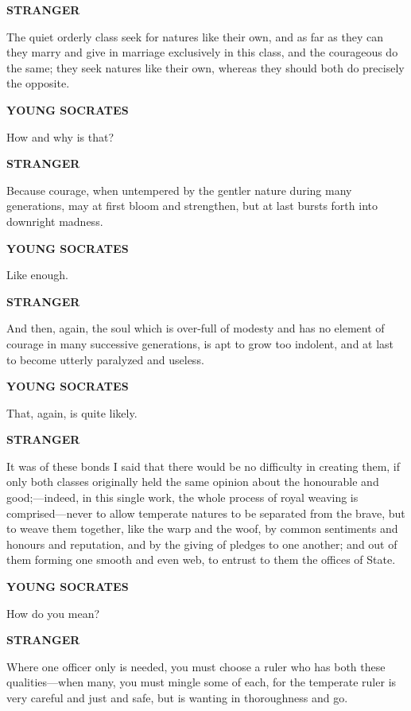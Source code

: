 \documentclass[11pt,letter]{article}
\begin{document}
\par \textbf{STRANGER}
\par   The quiet orderly class seek for natures like their own, and as far as they can they marry and give in marriage exclusively in this class, and the courageous do the same; they seek natures like their own, whereas they should both do precisely the opposite.

\par \textbf{YOUNG SOCRATES}
\par   How and why is that?

\par \textbf{STRANGER}
\par   Because courage, when untempered by the gentler nature during many generations, may at first bloom and strengthen, but at last bursts forth into downright madness.

\par \textbf{YOUNG SOCRATES}
\par   Like enough.

\par \textbf{STRANGER}
\par   And then, again, the soul which is over-full of modesty and has no element of courage in many successive generations, is apt to grow too indolent, and at last to become utterly paralyzed and useless.

\par \textbf{YOUNG SOCRATES}
\par   That, again, is quite likely.

\par \textbf{STRANGER}
\par   It was of these bonds I said that there would be no difficulty in creating them, if only both classes originally held the same opinion about the honourable and good;—indeed, in this single work, the whole process of royal weaving is comprised—never to allow temperate natures to be separated from the brave, but to weave them together, like the warp and the woof, by common sentiments and honours and reputation, and by the giving of pledges to one another; and out of them forming one smooth and even web, to entrust to them the offices of State.

\par \textbf{YOUNG SOCRATES}
\par   How do you mean?

\par \textbf{STRANGER}
\par   Where one officer only is needed, you must choose a ruler who has both these qualities—when many, you must mingle some of each, for the temperate ruler is very careful and just and safe, but is wanting in thoroughness and go.
\end{document}

